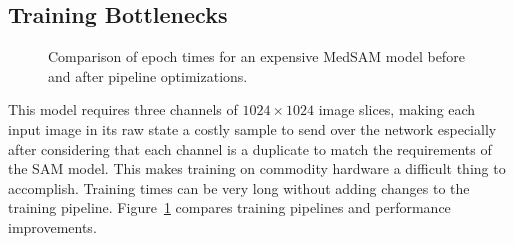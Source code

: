 \documentclass[12pt,twoside]{report}
\begin{document}
\subsection{Training Bottlenecks}

\begin{figure}[H]
  \centering
  \caption{Comparison of epoch times for an expensive MedSAM model before and after pipeline optimizations.}\label{fig:training-comparison-med}
\end{figure}

This model requires three channels of $1024 \times 1024$ image slices, making each input image in its raw state a costly sample to send over the network especially after considering that each channel is a duplicate to match the requirements of the SAM model. This makes training on commodity hardware a difficult thing to accomplish. Training times can be very long without adding changes to the training pipeline. Figure~\ref{fig:training-comparison-med} compares training pipelines and performance improvements. 
\end{document}
